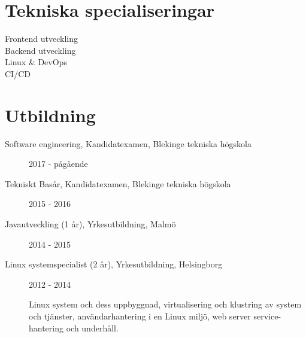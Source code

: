 \documentclass{article}
\begin{document}
\begin{minipage}[t]{0.4\textwidth}

\section*{\textcolor{colorBlue}{Tekniska specialiseringar}}

\begin{description}
  \item [ Frontend utveckling ]
  \item [ Backend utveckling ]
  \vspace{-5pt}\item [ Linux \& DevOps ] 
  \vspace{-5pt}\item [ CI/CD ]
  \vspace{-5pt}
\end{description}

\end{minipage}%
\hfill
\begin{minipage}[t]{0.6\textwidth}

\section*{\textcolor{colorBlue}{Utbildning}}

\begin{description}
  \item [ Software engineering, Kandidatexamen, Blekinge tekniska högskola ] 2017 - pågående
  \item [ Tekniskt Basår, Kandidatexamen, Blekinge tekniska högskola ] 2015 - 2016
  \item [ Javautveckling (1 år), Yrkesutbildning, Malmö ] 2014 - 2015

  \item [ Linux systemspecialist (2 år), Yrkesutbildning, Helsingborg ] 2012 - 2014 
  
  Linux system och dess uppbyggnad, virtualisering och klustring av 
 system och tjänster, användarhantering i en Linux miljö, web server 
 service-hantering och underhåll.
\end{description}

\end{minipage}%
\vspace{10pt}
\end{document}
